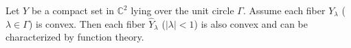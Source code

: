 
Let $Y$ be a compact set in $\mathbb{C}^2$ lying over the unit circle $\Gamma$. Assume each fiber $Y_\lambda$ ($\lambda \in \Gamma$) is convex. Then each fiber $\hat{Y}_\lambda$ ($|\lambda| < 1$) is also convex and can be characterized by function theory.
